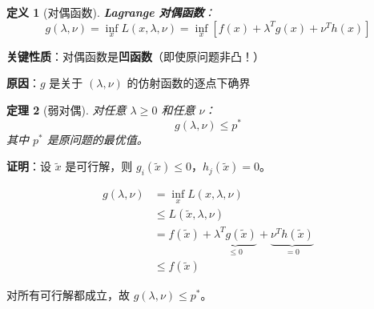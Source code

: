 \documentclass[12pt, a4paper]{ctexart}
\newtheorem{theorem}{定理}[section]
\newtheorem{definition}[theorem]{定义}
\begin{document}
\begin{blackboard}[对偶函数]

\begin{definition}[对偶函数]
\textbf{Lagrange 对偶函数}：
\[
g(\lambda, \nu) = \inf_x L(x, \lambda, \nu) = \inf_x \left[ f(x) + \lambda^T g(x) + \nu^T h(x) \right]
\]
\end{definition}

\textbf{关键性质}：对偶函数是\textbf{凹函数}（即使原问题非凸！）

\textbf{原因}：$g$ 是关于 $(\lambda, \nu)$ 的仿射函数的逐点下确界

\end{blackboard}

\begin{blackboard}[对偶函数的下界性质]

\begin{theorem}[弱对偶]
对任意 $\lambda \geq 0$ 和任意 $\nu$：
\[
g(\lambda, \nu) \leq p^*
\]
其中 $p^*$ 是原问题的最优值。
\end{theorem}

\textbf{证明}：设 $\tilde{x}$ 是可行解，则 $g_i(\tilde{x}) \leq 0$，$h_j(\tilde{x}) = 0$。

\begin{align*}
g(\lambda, \nu) &= \inf_x L(x, \lambda, \nu) \\
&\leq L(\tilde{x}, \lambda, \nu) \\
&= f(\tilde{x}) + \underbrace{\lambda^T g(\tilde{x})}_{\leq 0} + \underbrace{\nu^T h(\tilde{x})}_{= 0} \\
&\leq f(\tilde{x})
\end{align*}

对所有可行解都成立，故 $g(\lambda, \nu) \leq p^*$。

\end{blackboard}
\end{document}
